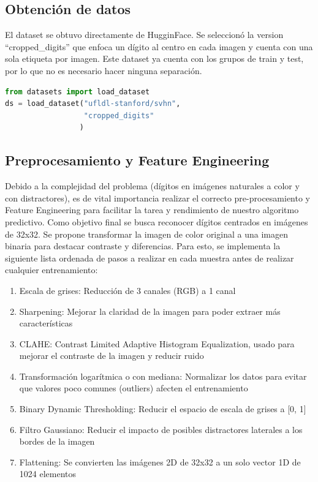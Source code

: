 \documentclass[journal]{IEEEtran}
\begin{document}
\subsection{Obtención de datos}
El dataset se obtuvo directamente de HugginFace.\cite{huggingface_svhn} Se seleccionó la version ``cropped\_digits'' que enfoca un dígito al centro en cada imagen y cuenta con una sola etiqueta por imagen. Este dataset ya cuenta con los grupos de train y test, por lo que no es necesario hacer ninguna separación.
\begin{lstlisting}[language=Python]
from datasets import load_dataset
ds = load_dataset("ufldl-stanford/svhn",
                  "cropped_digits"
                 )
\end{lstlisting}


\subsection{Preprocesamiento y Feature Engineering}
Debido a la complejidad del problema (dígitos en imágenes naturales a color y con distractores), es de vital importancia realizar el correcto pre-procesamiento y Feature Engineering para facilitar la tarea y rendimiento de nuestro algoritmo predictivo. Como objetivo final se busca reconocer dígitos centrados en imágenes de 32x32. Se propone transformar la imagen de color original a una imagen binaria para destacar contraste y diferencias. Para esto, se implementa la siguiente lista ordenada de pasos a realizar en cada muestra antes de realizar cualquier entrenamiento:

\begin{enumerate}
        \item Escala de grises: Reducción de 3 canales (RGB) a 1 canal
        \item Sharpening: Mejorar la claridad de la imagen para poder extraer más características
        \item CLAHE: Contrast Limited Adaptive Histogram Equalization, usado para mejorar el contraste de la imagen y reducir ruido
        \item Transformación logarítmica o con mediana: Normalizar los datos para evitar que valores poco comunes (outliers) afecten el entrenamiento
        \item Binary Dynamic Thresholding: Reducir el espacio de escala de grises a [0, 1]
        \item Filtro Gaussiano: Reducir el impacto de posibles distractores laterales a los bordes de la imagen
        \item Flattening: Se convierten las imágenes 2D de 32x32 a un solo vector 1D de 1024 elementos
\end{enumerate}
\end{document}

